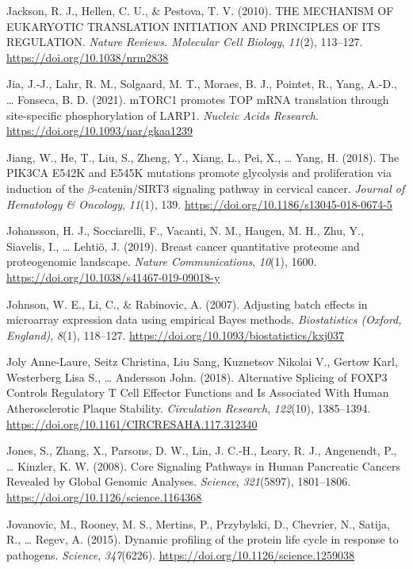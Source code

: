 \documentclass[12pt,openany]{book}
\begin{document}
\hypertarget{ref-Jackson2010a}{}
Jackson, R. J., Hellen, C. U., \& Pestova, T. V. (2010). THE MECHANISM
OF EUKARYOTIC TRANSLATION INITIATION AND PRINCIPLES OF ITS REGULATION.
\emph{Nature Reviews. Molecular Cell Biology}, \emph{11}(2), 113--127.
\url{https://doi.org/10.1038/nrm2838}

\hypertarget{ref-Jia2021}{}
Jia, J.-J., Lahr, R. M., Solgaard, M. T., Moraes, B. J., Pointet, R.,
Yang, A.-D., \ldots{} Fonseca, B. D. (2021). mTORC1 promotes TOP mRNA
translation through site-specific phosphorylation of LARP1.
\emph{Nucleic Acids Research}.
\url{https://doi.org/10.1093/nar/gkaa1239}

\hypertarget{ref-Jiang2018}{}
Jiang, W., He, T., Liu, S., Zheng, Y., Xiang, L., Pei, X., \ldots{}
Yang, H. (2018). The PIK3CA E542K and E545K mutations promote glycolysis
and proliferation via induction of the \(\beta\)-catenin/SIRT3 signaling
pathway in cervical cancer. \emph{Journal of Hematology \& Oncology},
\emph{11}(1), 139. \url{https://doi.org/10.1186/s13045-018-0674-5}

\hypertarget{ref-Johansson2019}{}
Johansson, H. J., Socciarelli, F., Vacanti, N. M., Haugen, M. H., Zhu,
Y., Siavelis, I., \ldots{} Lehtiö, J. (2019). Breast cancer quantitative
proteome and proteogenomic landscape. \emph{Nature Communications},
\emph{10}(1), 1600. \url{https://doi.org/10.1038/s41467-019-09018-y}

\hypertarget{ref-Johnson2007}{}
Johnson, W. E., Li, C., \& Rabinovic, A. (2007). Adjusting batch effects
in microarray expression data using empirical Bayes methods.
\emph{Biostatistics (Oxford, England)}, \emph{8}(1), 118--127.
\url{https://doi.org/10.1093/biostatistics/kxj037}

\hypertarget{ref-JolyAnne-Laure2018}{}
Joly Anne-Laure, Seitz Christina, Liu Sang, Kuznetsov Nikolai V., Gertow
Karl, Westerberg Lisa S., \ldots{} Andersson John. (2018). Alternative
Splicing of FOXP3 Controls Regulatory T Cell Effector Functions and Is
Associated With Human Atherosclerotic Plaque Stability.
\emph{Circulation Research}, \emph{122}(10), 1385--1394.
\url{https://doi.org/10.1161/CIRCRESAHA.117.312340}

\hypertarget{ref-Jones2008}{}
Jones, S., Zhang, X., Parsons, D. W., Lin, J. C.-H., Leary, R. J.,
Angenendt, P., \ldots{} Kinzler, K. W. (2008). Core Signaling Pathways
in Human Pancreatic Cancers Revealed by Global Genomic Analyses.
\emph{Science}, \emph{321}(5897), 1801--1806.
\url{https://doi.org/10.1126/science.1164368}

\hypertarget{ref-Jovanovic2015}{}
Jovanovic, M., Rooney, M. S., Mertins, P., Przybylski, D., Chevrier, N.,
Satija, R., \ldots{} Regev, A. (2015). Dynamic profiling of the protein
life cycle in response to pathogens. \emph{Science}, \emph{347}(6226).
\url{https://doi.org/10.1126/science.1259038}
\end{document}
